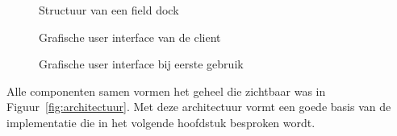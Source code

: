 \begin{figure}[!ht]
\centering
{}
\caption{Structuur van een field dock}
\label{fig:fieldDock}

\caption{Grafische user interface van de client}
\label{fig:overviewClient}

\caption{Grafische user interface bij eerste gebruik}
\label{fig:startClient}

\end{figure}

Alle componenten samen vormen het geheel die zichtbaar was in Figuur~\vref{fig:architectuur}.
Met deze architectuur vormt een goede basis van de implementatie die in het volgende hoofdstuk besproken wordt.

